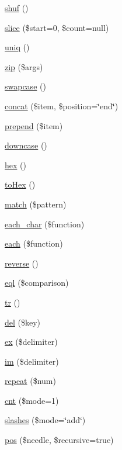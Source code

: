 \begin{DoxyCompactItemize}
\item 
\hyperlink{classr_a6595f5d5f838d64df0210138f2cef0bd}{shuf} ()
\item 
\hyperlink{classr_ae01473d9a4d7f2c33c1a157b9cce13f4}{slice} (\$start=0, \$count=null)
\item 
\hyperlink{classr_a032c9d1b1b6ac32627b95225479aa7c0}{uniq} ()
\item 
\hyperlink{classr_a2dba4fd3850e2c373dad4604d170dfa6}{zip} (\$args)
\item 
\hyperlink{classr_a04980c8e9024c09c700fdf68df9d5775}{swapcase} ()
\item 
\hyperlink{classr_a69c3762d52c367c08ca4dd234f5576df}{concat} (\$item, \$position=\char`\"{}end\char`\"{})
\item 
\hyperlink{classr_a7e2ed8a2b96e8c0340390647f081557c}{prepend} (\$item)
\item 
\hyperlink{classr_ac627a4ea49a87091d67dd7e1319bc872}{downcase} ()
\item 
\hyperlink{classr_a0c6f82bc490087648b9f1fef553e05eb}{hex} ()
\item 
\hyperlink{classr_a59e26fcd3f578f30737550623859abe7}{to\-Hex} ()
\item 
\hyperlink{classr_a59c310be108326e741acb1a678ff9bbe}{match} (\$pattern)
\item 
\hyperlink{classr_a52486765aad19321ca30127f786ca709}{each\-\_\-char} (\$function)
\item 
\hyperlink{classr_a6c0a4c47b3531bcc641e0aa02e155f00}{each} (\$function)
\item 
\hyperlink{classr_a601c54a2a4082e5d8dfc4509b07ea958}{reverse} ()
\item 
\hyperlink{classr_a3a9f9703b0a2b7a455a1e109f96f706d}{eql} (\$comparison)
\item 
\hyperlink{classr_a93130ece3f9aced2dcacf00ec6968413}{tr} ()
\item 
\hyperlink{classr_a4be48cfb26bfde30df2a0954ee852591}{del} (\$key)
\item 
\hyperlink{classr_ae05789292fafbb86600f74343762296c}{ex} (\$delimiter)
\item 
\hyperlink{classr_acb799c47bea88bda888622f887871c1c}{im} (\$delimiter)
\item 
\hyperlink{classr_ab924f20be77fca419f8433a2c8df810a}{repeat} (\$num)
\item 
\hyperlink{classr_ad8ade07cf9fec6dddec76822547a34b2}{cnt} (\$mode=1)
\item 
\hyperlink{classr_aee99d6b6d0c3479c48a98e76de963e06}{slashes} (\$mode=\char`\"{}add\char`\"{})
\item 
\hyperlink{classr_a3792ea27c7c50f1509214cbe67bd62e4}{pos} (\$needle, \$recursive=true)
\end{DoxyCompactItemize}
